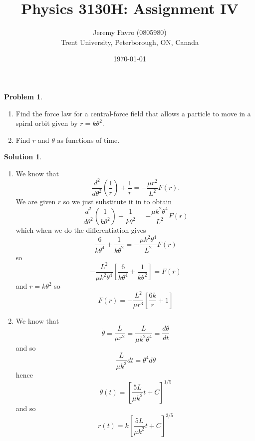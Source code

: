 \documentclass[10pt]{article}
\title{Physics 3130H: Assignment IV}
\author{Jeremy Favro (0805980) \\ Trent University, Peterborough, ON, Canada}
\date{\today}
\theoremstyle{definition}
\newtheorem{problem}{Problem}
\newtheorem{soln}{Solution}
\begin{document}
\maketitle

\begin{problem}~
\begin{enumerate}[label=(\roman*)]
  \item Find the force law for a central-force field that allows a particle to move in a spiral
        orbit given by $r=k\theta^2$.
  \item Find $r$ and $\theta$ as functions of time.
\end{enumerate}
\end{problem}
\begin{soln}~
  \begin{enumerate}[label=(\roman*)]
    \item We know that
          $$\frac{d^2}{d\theta^2}\left(\frac{1}{r}\right)+\frac{1}{r}=-\frac{\mu r^2}{L^2}F(r).$$
          We are given $r$ so we just substitute it in to obtain
          $$\frac{d^2}{d\theta^2}\left(\frac{1}{k\theta^2}\right)+\frac{1}{k\theta^2}=-\frac{\mu k^2\theta^4}{L^2}F(r)$$
          which when we do the differentiation gives
          $$\frac{6}{k\theta^4}+\frac{1}{k\theta^2}=-\frac{\mu k^2\theta^4}{L^2}F(r)$$
          so
          $$-\frac{L^2}{\mu k^2\theta^4}\left[\frac{6}{k\theta^4}+\frac{1}{k\theta^2}\right]=F(r)$$
          and $r=k\theta^2$ so
          $$F(r)=-\frac{L^2}{\mu r^3}\left[\frac{6k}{r}+1\right]$$
    \item We know that $$\dot{\theta}=\frac{L}{\mu r^2}=\frac{L}{\mu k^2\theta^4}=\frac{d\theta}{dt}$$
          and so
          $$\frac{L}{\mu k^2}dt=\theta^4 d\theta$$
          hence
          $$\theta(t)= \left[\frac{5L}{\mu k^2}t+C\right]^{1/5}$$
          and so
          $$r(t)=k\left[\frac{5L}{\mu k^2}t+C\right]^{2/5}$$
  \end{enumerate}
\end{soln}
\end{document}
